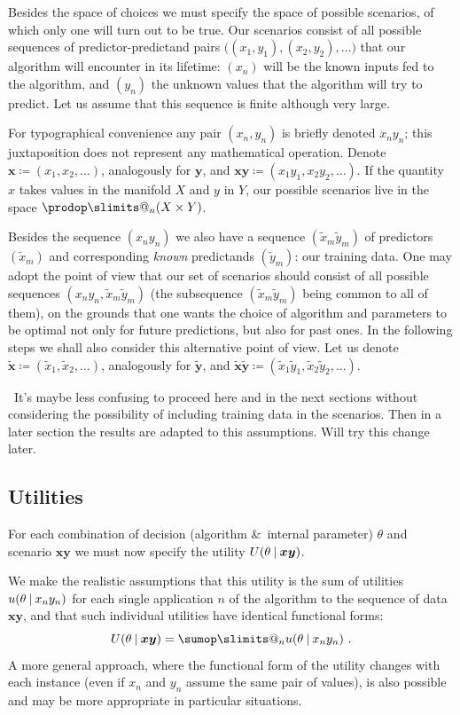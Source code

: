 \documentclass[\ifafour a4paper,12pt,\else a5paper,10pt,\fi%
onecolumn,oneside,article,%
british%
]{memoir}
\makeatletter
\theoremstyle{remark}
\theoremstyle{innote}
\def\sum{\DOTSI\sumop\slimits@}
\def\prod{\DOTSI\prodop\slimits@}
\newcommand*{\amp}{\&}
\newcommand*{\defd}{\coloneqq}
\renewcommand*{\|}[1][]{\nonscript\:#1\vert\nonscript\:\mathopen{}}
\newcommand*{\puzzle}{{\fontencoding{U}\fontfamily{fontawesometwo}\selectfont\symbol{225}}}
\newcommand{\mynote}[1]{ {\color{notecolour}#1}}
\newcommand*{\xx}[1]{x_{#1}}
\newcommand*{\yy}[1]{y_{#1}}
\newcommand*{\bx}{\bm{x}}
\newcommand*{\by}{\bm{y}}
\newcommand*{\bz}{\bm{xy}}
\newcommand*{\xxx}[1]{\tilde{x}_{#1}}
\newcommand*{\yyy}[1]{\tilde{y}_{#1}}
\newcommand*{\bxx}{\tilde{\bm{x}}}
\newcommand*{\byy}{\tilde{\bm{y}}}
\newcommand*{\bzz}{\tilde{\bm{x}}\tilde{\bm{y}}}
\makeatother
\begin{document}
Besides the space of choices we must specify the space of possible
scenarios, of which only one will turn out to be true. Our scenarios
consist of all possible sequences of predictor-predictand pairs
$\bigl((\xx{1}, \yy{1}), (\xx{2}, \yy{2}), \dotsc \bigr)$ that our
algorithm will encounter in its lifetime: $(\xx{n})$ will be the known
inputs fed to the algorithm, and $(\yy{n})$ the unknown values that the
algorithm will try to predict. Let us assume that this sequence is finite
although very large.

For typographical convenience any pair $(\xx{n}, \yy{n})$ is briefly
denoted $\xx{n}\yy{n}$; this juxtaposition does not represent any
mathematical operation. Denote $\bx \defd (\xx{1}, \xx{2}, \dotsc)$,
analogously for $\by$, and
$\bz \defd (\xx{1}\yy{1}, \xx{2}\yy{2}, \dotsc)$. If the quantity $x$
takes values in the manifold $X$ and $y$ in $Y$, our possible scenarios
live in the space $\prod_{n}(X\times Y)$.

Besides the sequence $(\xx{n}\yy{n})$ we also have a sequence
$(\xxx{m}\yyy{m})$ of predictors $(\xxx{m})$ and corresponding
\emph{known} predictands $(\yyy{m})$: our training data. One may adopt
the point of view that our set of scenarios should consist of all possible
sequences $(\xx{n}\yy{n}, \xxx{m}\yyy{m})$ (the subsequence
$(\xxx{m}\yyy{m})$ being common to all of them), on the grounds that
one wants the choice of algorithm and parameters to be optimal not only for
future predictions, but also for past ones. In the following steps we shall
also consider this alternative point of view. Let us denote
$\bxx \defd (\xxx{1}, \xxx{2}, \dotsc)$, analogously for $\byy$, and
$\bzz \defd (\xxx{1}\yyy{1}, \xxx{2}\yyy{2}, \dotsc)$.

\mynote{\puzzle\ It's maybe less confusing to proceed here and in the next
  sections without considering the possibility of including training data
  in the scenarios. Then in a later section the results are adapted to this
  assumptions. Will try this change later.}


\subsection{Utilities}
\label{sec:utilities}

For each combination of decision (algorithm \amp\ internal parameter)
$\theta$ and scenario $\bz$ we must now specify the utility
$U(\theta \| \bz)$.

We make the realistic assumptions that this utility is the sum of utilities
$u(\theta \| \xx{n}\yy{n})$ for each single application $n$ of the
algorithm to the sequence of data $\bz$, and that such individual utilities
have identical functional forms:
\begin{equation}
  \label{eq:total_utility}
  U(\theta \| \bz) = \sum_{n} u(\theta \| \xx{n}\yy{n}) \ .
\end{equation}
A more general approach, where the functional form of the utility changes
with each instance (even if $\xx{n}$ and $\yy{n}$ assume the same pair of
values), is also possible and may be more appropriate in particular
situations.
\end{document}
